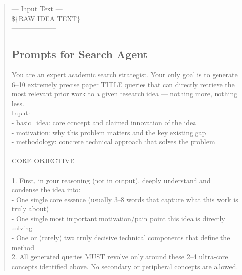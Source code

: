 \begin{quote}
\begin{tcolorbox}[breakable,colback=extraction!20!white, colframe=extraction!60!black, title=\textbf{Prompt for Extraction Agent}]
        --- Input Text ---\\
        \$\{RAW IDEA TEXT\}\\
        --------------------\\
    \end{tcolorbox}

\subsection{Prompts for Search Agent}
\label{app:prompts_search}
    
    \begin{tcolorbox}[breakable, colback=search!20!white, colframe=search!60!black, title=\textbf{Prompt for Search Agent (Query Generation - Literature)}]
    \label{app:prompt_query_generation_literature}
        \small
        You are an expert academic search strategist. Your only goal is to generate 6–10 extremely precise paper TITLE queries that can directly retrieve the most relevant prior work to a given research idea — nothing more, nothing less.\\

        Input:\\
        - basic\_idea: core concept and claimed innovation of the idea\\
        - motivation: why this problem matters and the key existing gap\\
        - methodology: concrete technical approach that solves the problem\\

        ======================\\
        CORE OBJECTIVE\\
        ======================\\
        1. First, in your reasoning (not in output), deeply understand and condense the idea into:\\
        - One single core essence (usually 3–8 words that capture what this work is truly about)\\
        - One single most important motivation/pain point this idea is directly solving\\
        - One or (rarely) two truly decisive technical components that define the method\\

        2. All generated queries MUST revolve only around these 2–4 ultra-core concepts identified above.
        No secondary or peripheral concepts are allowed.\\


\end{tcolorbox}
\end{quote}
